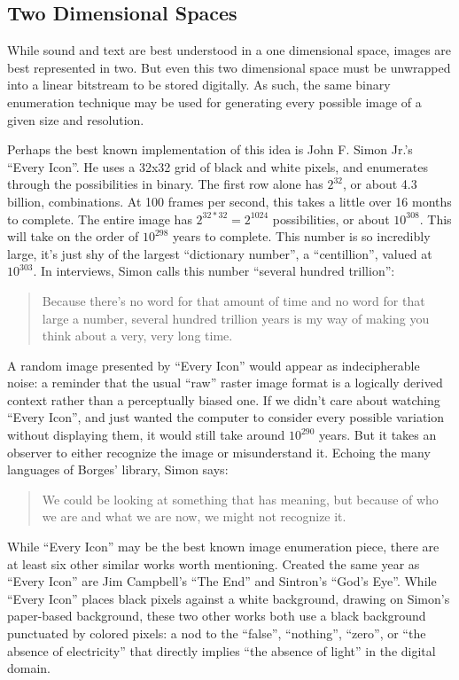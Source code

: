 \documentclass{thesis}
\begin{document}
\subsection{Two Dimensional Spaces}

While sound and text are best understood in a one dimensional space, images are best represented in two. But even this two dimensional space must be unwrapped into a linear bitstream to be stored digitally. As such, the same binary enumeration technique may be used for generating every possible image of a given size and resolution.
	
Perhaps the best known implementation of this idea is John F. Simon Jr.'s ``Every Icon''\cite{john_f._simon_jr._every_????}. He uses a 32x32 grid of black and white pixels, and enumerates through the possibilities in binary. The first row alone has $2^{32}$, or about 4.3 billion, combinations. At 100 frames per second, this takes a little over 16 months to complete. The entire image has $2^{32*32}=2^{1024}$ possibilities, or about $10^{308}$. This will take on the order of $10^{298}$ years to complete. This number is so incredibly large, it's just shy of the largest ``dictionary number'', a ``centillion'', valued at $10^{303}$. In interviews, Simon calls this number ``several hundred trillion''\cite{matthew_mirapaul_in_1997}:
	
	\begin{quote}
	Because there's no word for that amount of time and no word for that large a number, several hundred trillion years is my way of making you think about a very, very long time.
	\end{quote}
	
A random image presented by ``Every Icon'' would appear as indecipherable noise: a reminder that the usual ``raw'' raster image format is a logically derived context rather than a perceptually biased one. If we didn't care about watching ``Every Icon'', and just wanted the computer to consider every possible variation without displaying them, it would still take around $10^{290}$ years. But it takes an observer to either recognize the image or misunderstand it. Echoing the many languages of Borges' library, Simon says:
	
	\begin{quote}
	We could be looking at something that has meaning, but because of who we are and what we are now, we might not recognize it.
	\end{quote}
	
While ``Every Icon'' may be the best known image enumeration piece, there are at least six other similar works worth mentioning. Created the same year as ``Every Icon'' are Jim Campbell's ``The End''\cite{jim_campbell_end_1996} and Sintron's ``God's Eye''\cite{sintron_gods_2003}. While ``Every Icon'' places black pixels against a white background, drawing on Simon's paper-based background, these two other works both use a black background punctuated by colored pixels: a nod to the ``false'', ``nothing'', ``zero'',  or ``the absence of electricity'' that directly implies ``the absence of light'' in the digital domain.
	
\end{document}
